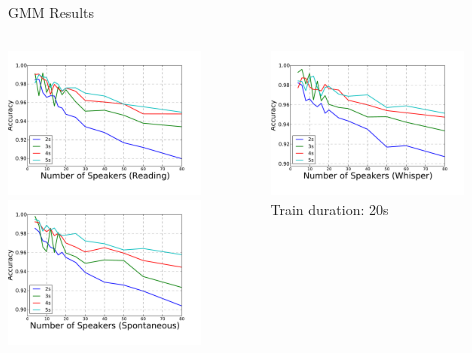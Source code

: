 \begin{frame}{GMM Results}
  \begin{columns}[t]
    \begin{column}[t]{0.5\textwidth}
      \begin{center}
        \includegraphics[width=0.8\textwidth]{res/reading.pdf}\\
        \includegraphics[width=0.8\textwidth]{res/spont.pdf}
      \end{center}
    \end{column}
    \begin{column}[t]{0.5\textwidth}
      \begin{center}
        \includegraphics[width=0.8\textwidth]{res/whisper.pdf}\\
        Train duration: 20s


\end{center}
\end{column}
\end{columns}
\end{frame}
